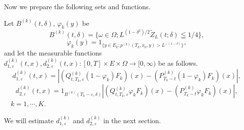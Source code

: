 \documentclass[12pt]{article}
\begin{document}
Now we prepare the following sets and functions.

Let $B^{(k)}(t, \delta)$, $\varphi_k(y)$ be 
$$
B^{(k)}(t, \delta) = \{\omega \in \Omega; L^{(1-\delta^2)/2}\tilde{Z}_L(t; \delta)
\leqq 1/4 \},
$$
$$
\varphi_k(y) = 1_{\{ y \in E_k; p^{(k)}(T_k, x_0, y) > L^{-(1-\delta)} \}},
$$
and let the measurable functions $ d_{1,\varepsilon}^{(k)}(t,x) , d_{2,\varepsilon}^{(k)}(t,x)  : [0,T] \times E \times \Omega \to [0, \infty)$ be as follows.
$$ d_{1,\varepsilon}^{(k)}(t,x) = |(Q_{t,T_k, \varepsilon}^{(k)}(1-\varphi_k)F_k)(x)
-(P_{T_k-t}^{(k)} (1-\varphi_k)F_k)(x) |,$$
$$ d_{2,\varepsilon}^{(k)}(t,x) = 1_{B^{(k)}(T_k-\varepsilon, \delta)}|(Q_{t,T_k, \varepsilon}^{(k)}\varphi_kF_k)(x)
-(P_{T_k-t}^{(k)} \varphi_kF_k)(x) |,$$
$\quad k = 1, \cdots, K.$

 We will estimate $d_{1,\varepsilon}^{(k)}$ and $d_{2,\varepsilon}^{(k)}$ in the next section.
\end{document}

